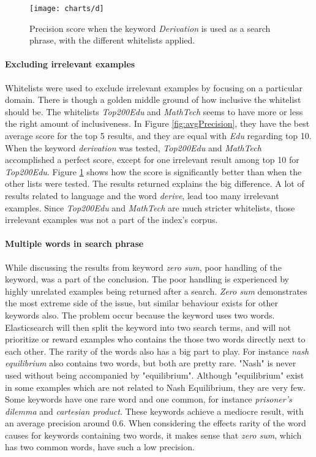 \begin{figure}[h] 
\caption{Precision score when the keyword \textit{Derivation} is used as a search phrase, with the different whitelists applied.}
\texttt{[image: charts/d]}
\label{fig:d}
\end{figure}

\paragraph{Excluding irrelevant examples}
Whitelists were used to exclude irrelevant examples by focusing on a particular domain. There is though a golden middle ground of how inclusive the whitelist should be. The whitelists \textit{Top200Edu} and \textit{MathTech} seems to have more or less the right amount of inclusiveness. In Figure \ref{fig:avgPrecision}, they have the best average score for the top 5 results, and they are equal with \textit{Edu} regarding top 10. When the keyword \textit{derivation} was tested, \textit{Top200Edu} and \textit{MathTech} accomplished a perfect score, except for one irrelevant result among top 10 for \textit{Top200Edu}. Figure \ref{fig:d} shows how the score is significantly better than when the other lists were tested. The results returned explains the big difference. A lot of results related to language and the word \textit{derive}, lead too many irrelevant examples. Since \textit{Top200Edu} and \textit{MathTech} are much stricter whitelists, those irrelevant examples was not a part of the index's corpus.

\paragraph{Multiple words in search phrase}
While discussing the results from keyword \textit{zero sum}, poor handling of the keyword, was a part of the conclusion. The poor handling is experienced by highly unrelated examples being returned after a search. \textit{Zero sum} demonstrates the most extreme side of the issue, but similar behaviour exists for other keywords also. The problem occur because the keyword uses two words. Elasticsearch will then split the keyword into two search terms, and will not prioritize or reward examples who contains the those two words directly next to each other. The rarity of the words also has a big part to play. For instance \textit{nash equilibrium} also contains two words, but both are pretty rare. "Nash" is never used without being accompanied by "equilibrium". Although "equilibrium" exist in some examples which are not related to Nash Equilibrium, they are very few. Some keywords have one rare word and one common, for instance \textit{prisoner's dilemma} and \textit{cartesian product}. These keywords achieve a mediocre result, with an average precision around 0.6. When considering the effects rarity of the word causes for keywords containing two words, it makes sense that \textit{zero sum}, which has two common words, have such a low precision. 

